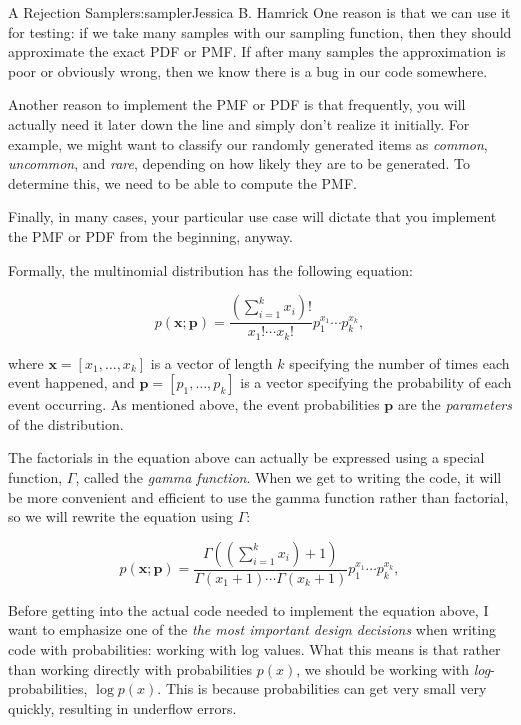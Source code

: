 \begin{aosachapter}{A Rejection Sampler}{s:sampler}{Jessica B. Hamrick}
One reason is that we can use it for testing: if we take many samples
with our sampling function, then they should approximate the exact PDF
or PMF. If after many samples the approximation is poor or obviously
wrong, then we know there is a bug in our code somewhere.

Another reason to implement the PMF or PDF is that frequently, you will
actually need it later down the line and simply don't realize it
initially. For example, we might want to classify our randomly generated
items as \emph{common}, \emph{uncommon}, and \emph{rare}, depending on
how likely they are to be generated. To determine this, we need to be
able to compute the PMF.

Finally, in many cases, your particular use case will dictate that you
implement the PMF or PDF from the beginning, anyway.

\label{the-multinomial-pmf-equation}

Formally, the multinomial distribution has the following equation:

\[
p(\mathbf{x}; \mathbf{p}) = \frac{(\sum_{i=1}^k x_i)!}{x_1!\cdots{}x_k!}p_1^{x_1}\cdots{}p_k^{x_k},
\]

where $\mathbf{x}=[x_1, \ldots{}, x_k]$ is a vector of length $k$
specifying the number of times each event happened, and
$\mathbf{p}=[p_1, \ldots{}, p_k]$ is a vector specifying the probability
of each event occurring. As mentioned above, the event probabilities
$\mathbf{p}$ are the \emph{parameters} of the distribution.

The factorials in the equation above can actually be expressed using a
special function, $\Gamma$, called the \emph{gamma function}. When we
get to writing the code, it will be more convenient and efficient to use
the gamma function rather than factorial, so we will rewrite the
equation using $\Gamma$:

\[
p(\mathbf{x}; \mathbf{p}) = \frac{\Gamma((\sum_{i=1}^k x_i)+1)}{\Gamma(x_1+1)\cdots{}\Gamma(x_k+1)}p_1^{x_1}\cdots{}p_k^{x_k},
\]

\label{working-with-log-values}

Before getting into the actual code needed to implement the equation
above, I want to emphasize one of the \emph{the most important design
decisions} when writing code with probabilities: working with log
values. What this means is that rather than working directly with
probabilities $p(x)$, we should be working with
\emph{log}-probabilities, $\log{p(x)}$. This is because probabilities
can get very small very quickly, resulting in underflow errors.


\end{aosachapter}
